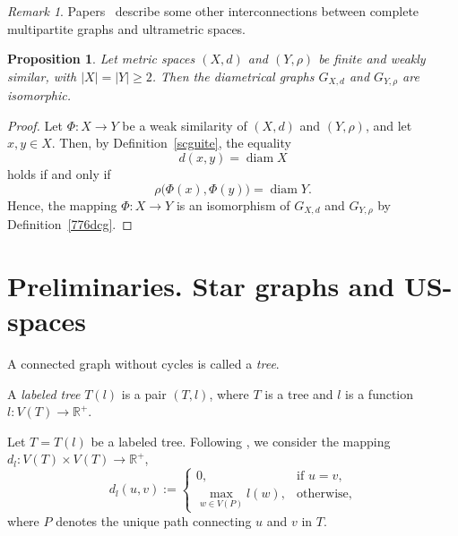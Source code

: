 \documentclass[11pt]{article}
\newtheorem{proposition}[theorem]{Proposition}
\theoremstyle{definition}
\theoremstyle{remark}
\newtheorem{remark}[theorem]{Remark}
\numberwithin{equation}{section}
\begin{document}
\begin{remark}
\label{rem:3.3}
Papers~\cite{BDK2022TAG,SDL2022} describe some other interconnections between
complete multipartite graphs and ultrametric spaces.
\end{remark}

\begin{proposition}
\label{prop:3.4}
Let metric spaces $(X,d)$ and $(Y,\rho)$ be finite and weakly similar, 
with $|X| = |Y| \geq 2$.  
Then the diametrical graphs $G_{X,d}$ and $G_{Y,\rho}$ are isomorphic.
\end{proposition}

\begin{proof}
Let $\Phi : X \to Y$ be a weak similarity of $(X,d)$ and $(Y,\rho)$, and let $x,y \in X$. Then, by Definition~\ref{scguite},
  the equality
\begin{equation*}
d(x,y) = \operatorname{diam} X
\end{equation*}
holds if and only if
\begin{equation*}
\rho\bigl(\Phi(x), \Phi(y)\bigr) = \operatorname{diam} Y.
\end{equation*}
Hence, the mapping $\Phi : X \to Y$ is an isomorphism of 
$G_{X,d}$ and $G_{Y,\rho}$ by Definition~\ref{776dcg}.
\end{proof}




\section{Preliminaries. Star graphs and {\bf US}-spaces}


\hspace{5 mm} A connected graph without cycles is called a \textit{tree}.




A \textit{labeled tree} $T(l)$ is a pair $(T, l)$, where $T$ is a tree and $l$ is a function
$
l \colon V(T) \to \mathbb{R}^+.
$


Let $T = T(l)$ be a labeled tree. Following \cite{Dov2020TaAoG}, we consider the mapping $d_l \colon V(T) \times V(T) \to \mathbb{R}^+$,
\begin{equation}
\label{e1.1}
d_l(u, v) :=
\begin{cases}
0, & \text{if } u = v, \\
\max\limits_{w \in V(P)} l(w), & \text{otherwise},
\end{cases}
\end{equation}
where $P$ denotes the unique path connecting $u$ and $v$ in $T$.
\end{document}
